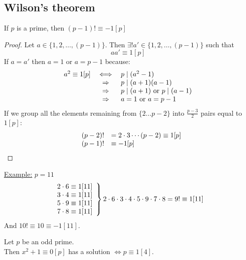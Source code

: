 \documentclass{report}
\begin{document}
\subsection*{Wilson's theorem}
If $p$ is a prime, then $(p-1)! \equiv -1[p]$
\begin{proof}
Let $a \in \{ 1,2,\dots,(p-1) \}$. Then $\exists ! a' \in \{ 1,2,\dots,(p-1) \}$ such that
\[ aa' \equiv 1 [p] \]
If $a=a'$ then $a=1$ or $a=p-1$ because:
\[
\begin{array}{r c l}
a^2 \equiv 1[p] &\iff& p \mid (a^2-1)\\
&\Rightarrow& p \mid (a+1)(a-1)\\
&\Rightarrow& p \mid (a+1) \text{ or } p \mid (a-1)\\
&\Rightarrow& a=1 \text{ or } a=p-1 \\
\end{array}
\]
If we group all the elements remaining from $ \{ 2 \dots p-2 \} $ into $\frac{p-3}{2}$ pairs equal to $1[p]$:
\[
\begin{array}{r c l}
&(p-2)!&=2 \cdot 3 \cdots (p-2) \equiv 1[p]\\
&(p-1)!& \equiv -1[p]\\
\end{array}
\]
\end{proof}
\underline{Example:} $p=11$
\[
\left.
\begin{array}{r c l}
2 \cdot 6 \equiv 1[11]\\
3 \cdot 4 \equiv 1[11]\\
5 \cdot 9 \equiv 1[11]\\
7 \cdot 8 \equiv 1[11]\\
\end{array}
\right \}
2 \cdot 6 \cdot 3 \cdot 4 \cdot 5 \cdot 9 \cdot 7 \cdot 8 = 9! \equiv 1[11] \]
And $10! \equiv 10 \equiv -1[11]$.
\begin{thm} Let $p$ be an odd prime. \\Then $x^2+1 \equiv 0 [p]$ has a solution $\iff p \equiv 1[4]$.
\end{thm}
\end{document}
